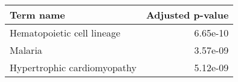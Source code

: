 \begin{tabular}{lr}
\toprule
                  Term name &  Adjusted p-value \\
\midrule
 Hematopoietic cell lineage &          6.65e-10 \\
                    Malaria &          3.57e-09 \\
Hypertrophic cardiomyopathy &          5.12e-09 \\
\bottomrule
\end{tabular}
